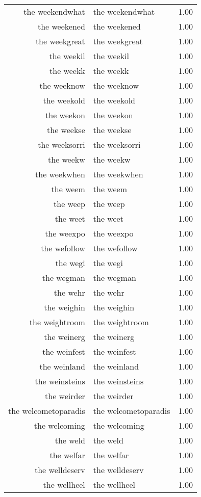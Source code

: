 \begin{table}[ht]
\begin{tabular}{rlr}
  the weekendwhat & the weekendwhat & 1.00 \\ 
  the weekened & the weekened & 1.00 \\ 
  the weekgreat & the weekgreat & 1.00 \\ 
  the weekil & the weekil & 1.00 \\ 
  the weekk & the weekk & 1.00 \\ 
  the weeknow & the weeknow & 1.00 \\ 
  the weekold & the weekold & 1.00 \\ 
  the weekon & the weekon & 1.00 \\ 
  the weekse & the weekse & 1.00 \\ 
  the weeksorri & the weeksorri & 1.00 \\ 
  the weekw & the weekw & 1.00 \\ 
  the weekwhen & the weekwhen & 1.00 \\ 
  the weem & the weem & 1.00 \\ 
  the weep & the weep & 1.00 \\ 
  the weet & the weet & 1.00 \\ 
  the weexpo & the weexpo & 1.00 \\ 
  the wefollow & the wefollow & 1.00 \\ 
  the wegi & the wegi & 1.00 \\ 
  the wegman & the wegman & 1.00 \\ 
  the wehr & the wehr & 1.00 \\ 
  the weighin & the weighin & 1.00 \\ 
  the weightroom & the weightroom & 1.00 \\ 
  the weinerg & the weinerg & 1.00 \\ 
  the weinfest & the weinfest & 1.00 \\ 
  the weinland & the weinland & 1.00 \\ 
  the weinsteins & the weinsteins & 1.00 \\ 
  the weirder & the weirder & 1.00 \\ 
  the welcometoparadis & the welcometoparadis & 1.00 \\ 
  the welcoming & the welcoming & 1.00 \\ 
  the weld & the weld & 1.00 \\ 
  the welfar & the welfar & 1.00 \\ 
  the welldeserv & the welldeserv & 1.00 \\ 
  the wellheel & the wellheel & 1.00 \\ 

\end{tabular}
\end{table}
